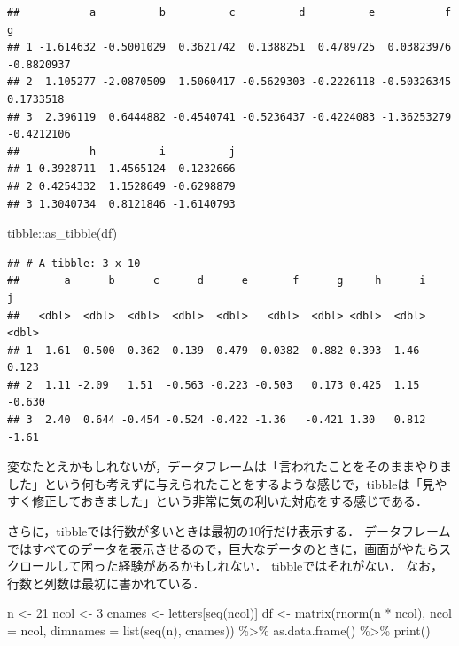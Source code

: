 \documentclass[
]{article}
\newenvironment{Shaded}{\begin{snugshade}}{\end{snugshade}}
\newcommand{\AttributeTok}[1]{\textcolor[rgb]{0.77,0.63,0.00}{#1}}
\newcommand{\DecValTok}[1]{\textcolor[rgb]{0.00,0.00,0.81}{#1}}
\newcommand{\FunctionTok}[1]{\textcolor[rgb]{0.00,0.00,0.00}{#1}}
\newcommand{\NormalTok}[1]{#1}
\newcommand{\OtherTok}[1]{\textcolor[rgb]{0.56,0.35,0.01}{#1}}
\newcommand{\SpecialCharTok}[1]{\textcolor[rgb]{0.00,0.00,0.00}{#1}}
\begin{document}
\begin{verbatim}
##           a          b          c          d          e           f          g
## 1 -1.614632 -0.5001029  0.3621742  0.1388251  0.4789725  0.03823976 -0.8820937
## 2  1.105277 -2.0870509  1.5060417 -0.5629303 -0.2226118 -0.50326345  0.1733518
## 3  2.396119  0.6444882 -0.4540741 -0.5236437 -0.4224083 -1.36253279 -0.4212106
##           h          i          j
## 1 0.3928711 -1.4565124  0.1232666
## 2 0.4254332  1.1528649 -0.6298879
## 3 1.3040734  0.8121846 -1.6140793
\end{verbatim}

\begin{Shaded}
\begin{Highlighting}[]
\NormalTok{tibble}\SpecialCharTok{::}\FunctionTok{as\_tibble}\NormalTok{(df)}
\end{Highlighting}
\end{Shaded}

\begin{verbatim}
## # A tibble: 3 x 10
##       a      b      c      d      e       f      g     h      i      j
##   <dbl>  <dbl>  <dbl>  <dbl>  <dbl>   <dbl>  <dbl> <dbl>  <dbl>  <dbl>
## 1 -1.61 -0.500  0.362  0.139  0.479  0.0382 -0.882 0.393 -1.46   0.123
## 2  1.11 -2.09   1.51  -0.563 -0.223 -0.503   0.173 0.425  1.15  -0.630
## 3  2.40  0.644 -0.454 -0.524 -0.422 -1.36   -0.421 1.30   0.812 -1.61
\end{verbatim}

変なたとえかもしれないが，データフレームは「言われたことをそのままやりました」という何も考えずに与えられたことをするような感じで，tibbleは「見やすく修正しておきました」という非常に気の利いた対応をする感じである．

さらに，tibbleでは行数が多いときは最初の10行だけ表示する．
データフレームではすべてのデータを表示させるので，巨大なデータのときに，画面がやたらスクロールして困った経験があるかもしれない．
tibbleではそれがない．
なお，行数と列数は最初に書かれている．

\begin{Shaded}
\begin{Highlighting}[]
\NormalTok{n }\OtherTok{\textless{}{-}} \DecValTok{21}
\NormalTok{ncol }\OtherTok{\textless{}{-}} \DecValTok{3}
\NormalTok{cnames }\OtherTok{\textless{}{-}}\NormalTok{ letters[}\FunctionTok{seq}\NormalTok{(ncol)]}
\NormalTok{df }\OtherTok{\textless{}{-}} 
  \FunctionTok{matrix}\NormalTok{(}\FunctionTok{rnorm}\NormalTok{(n }\SpecialCharTok{*}\NormalTok{ ncol), }\AttributeTok{ncol =}\NormalTok{ ncol, }\AttributeTok{dimnames =} \FunctionTok{list}\NormalTok{(}\FunctionTok{seq}\NormalTok{(n), cnames)) }\SpecialCharTok{\%\textgreater{}\%}
  \FunctionTok{as.data.frame}\NormalTok{() }\SpecialCharTok{\%\textgreater{}\%}
  \FunctionTok{print}\NormalTok{()}
\end{Highlighting}
\end{Shaded}
\end{document}
